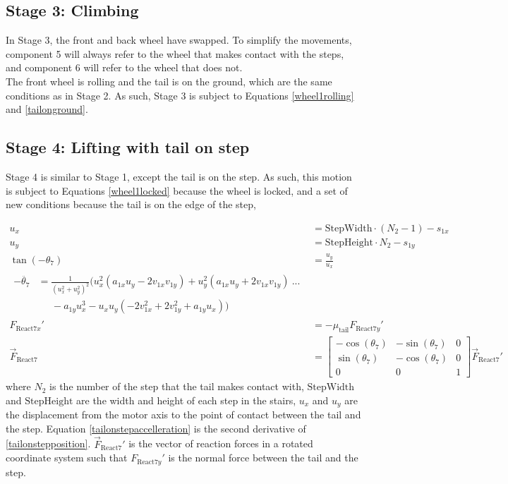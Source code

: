 \subsection*{Stage 3: Climbing}

In Stage 3, the front and back wheel have swapped. To simplify the movements, component 5 will always refer to the wheel that makes contact with the steps, and component 6 will refer to the wheel that does not. \\
The front wheel is rolling and the tail is on the ground, which are the same conditions as in Stage 2. As such, Stage 3 is subject to Equations \ref{wheel1rolling} and \ref{tailonground}.

\subsection*{Stage 4: Lifting with tail on step}
Stage 4 is similar to Stage 1, except the tail is on the step. As such, this motion is subject to Equations \ref{wheel1locked} because the wheel is locked, and a set of new conditions because the tail is on the edge of the step,

\begin{subequations}
	\label{tailonstep}
	\begin{align}
		u_x &= \mathrm{StepWidth}\cdot (N_2-1)- s_{1x}\\
		u_y &= \mathrm{StepHeight}\cdot N_2 - s_{1y}\\
		\tan{(-\theta_7)} &= \frac{u_y}{u_x}\label{tailonstepposition}\\
		\begin{split}
		-\ddot{\theta_7} &= \frac{1}
		{(u_x^2 + u_y^2)^2}
		\Big( u_x^2 (a_{1x} u_y  - 2 v_{1x} v_{1y})
		+ u_y^2 (a_{1x} u_y + 2  v_{1x}  v_{1y}  )  \: ...\\
		&\;\;\;\;\;-  a_{1y} u_x^3 
		- u_x  u_y  (- 2  v_{1x}^2 + 2 v_{1y}^2 + a_{1y} u_x  )\Big)
		\end{split}
		\label{tailonstepaccelleration}\\
		F_{\mathrm{React}7x}' &= -\mu_{\mathrm{tail}} F_{\mathrm{React}7y}'\\
		\vec{F}_{\mathrm{React}7} &= \begin{bmatrix}
			-\cos{(\theta_7)} & -\sin{(\theta_7)} & 0\\
			\sin{(\theta_7)} & -\cos{(\theta_7)} & 0\\
			0 & 0 & 1
		\end{bmatrix} \vec{F}_{\mathrm{React}7}'
	\end{align}
\end{subequations}
where $N_2$ is the number of the step that the tail makes contact with, $\mathrm{StepWidth}$ and $\mathrm{StepHeight}$ are the width and height of each step in the stairs, $u_x$ and $u_y$ are the displacement from the motor axis to the point of contact between the tail and the step. Equation \ref{tailonstepaccelleration} is the second derivative of \ref{tailonstepposition}. $\vec{F}_{\mathrm{React}7}'$ is the vector of reaction forces in a rotated coordinate system such that $F_{\mathrm{React}7y}'$ is the normal force between the tail and the step.

